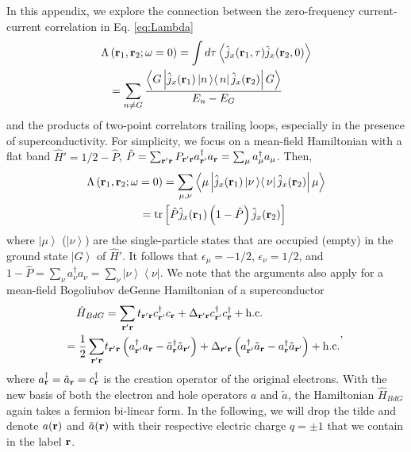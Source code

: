 \documentclass[amsmath,amssymb, aps, prx, longbibliography, twocolumn]{revtex4-1}
\begin{document}
In this appendix, we explore the connection between the zero-frequency current-current correlation in Eq. \ref{eq:Lambda}
\begin{equation}
\left. \begin{aligned}
\Lambda&\left({\bf r}_1, {\bf r}_2;\omega=0\right) = \int d\tau \left\langle \hat{j}_x({\bf r}_1,\tau)\hat{j}_x({\bf r}_2,0) \right\rangle  \\
&=\sum_{n\ne G} \frac{\left\langle G \left| \hat{j}_x({\bf r}_1)  \left|n\left\rangle  \right\langle n\right| \hat{j}_x({\bf r}_2)\right| G\right\rangle}{E_n-E_G} 
\end{aligned}
\right.
\end{equation}
and the products of two-point correlators trailing loops, especially in the presence of superconductivity. For simplicity, we focus on a mean-field Hamiltonian with a flat band $\hat{H}'=1/2-\hat P$, $\hat P=\sum_{{\bf r}'{\bf r}}P_{{\bf r}'{\bf r}}a^\dagger_{{\bf r}'} a_{\bf r}=\sum_{\mu}a^\dagger_\mu a_\mu$. Then, 
\begin{equation}
\left. \begin{aligned}
\Lambda\left({\bf r}_1, {\bf r}_2;\omega=0\right)&
=\sum_{\mu, \nu}\left\langle \mu \left| \hat{j}_x({\bf r}_1)  \left|\nu\left\rangle  \right\langle \nu\right|\hat{j}_x({\bf r}_2)\right| \mu\right\rangle \\
= \mbox{tr}&\left[\hat{P} \hat{j}_x({\bf r}_1) \left(1-\hat{P}\right) \hat{j}_x({\bf r}_2)\right]
\end{aligned}
\right.
\label{eq:app1}
\end{equation}
where $\left|\mu\right\rangle$ ($\left|\nu\right\rangle$) are the single-particle states that are occupied (empty) in the ground state $\left|G\right\rangle$ of $\hat{H}'$. It follows that $\epsilon_\mu=-1/2$, $\epsilon_\nu=1/2$, and $1-\hat P=\sum_{\nu}a^\dagger_\nu a_\nu=\sum_{\nu}\left|\nu\right\rangle\left\langle\nu\right|$. We note that the arguments also apply for a mean-field Bogoliubov deGenne Hamiltonian of a superconductor
\begin{equation}
\left. \begin{aligned}
\hat{H}_{BdG} & =  \sum_{\bf{r}'\bf{r}}t_{\bf{r}'\bf{r}}c_{\bf{r}'}^{\dagger}c_{\bf{r}}+\Delta_{\bf{r}'\bf{r}}c_{\bf{r}'}^{\dagger}c_{\bf{r}}^{\dagger}+\mbox{h.c.}\\
=\frac{1}{2}\sum_{\bf{r}'\bf{r}}&t_{\bf{r}'\bf{r}}\left(a_{\bf{r}'}^{\dagger}a_{\bf{r}}-\tilde{a}_{\bf{r}}^{\dagger}\tilde{a}_{\bf{r}'}\right)
+\Delta_{\bf{r}'\bf{r}}\left(a_{\bf{r}'}^{\dagger}\tilde{a}_{\bf{r}}-a_{\bf{r}}^{\dagger}\tilde{a}_{\bf{r}'}\right)+\mbox{h.c.}
\end{aligned},
\right.
\end{equation}
where $a_{\bf{r}}^\dagger=\tilde{a}_{\bf{r}}=c_{\bf{r}}^\dagger$ is the creation operator of the original electrons. With the new basis of both the electron and hole operators $a$ and $\tilde{a}$, the Hamiltonian $\hat{H}_{BdG}$ again takes a fermion bi-linear form. In the following, we will drop the tilde and denote $a(\bf{r})$ and $\tilde{a}(\bf{r})$ with their respective electric charge $q=\pm 1$ that we contain in the label $\bf{r}$.
\end{document}
